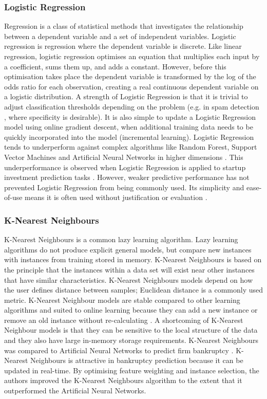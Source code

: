 \documentclass[../thesis/thesis.tex]{subfiles}
\begin{document}
\begin{refsection}
\subsubsection{Logistic Regression}

Regression is a class of statistical methods that investigates the relationship between a dependent variable and a set of independent variables. Logistic regression is regression where the dependent variable is discrete. Like linear regression, logistic regression optimises an equation that multiplies each input by a coefficient, sums them up, and adds a constant. However, before this optimisation takes place the dependent variable is transformed by the log of the odds ratio for each observation, creating a real continuous dependent variable on a logistic distribution. A strength of Logistic Regression is that it is trivial to adjust classification thresholds depending on the problem (e.g. in spam detection \cite{friedman2001}, where specificity is desirable). It is also simple to update a Logistic Regression model using online gradient descent, when additional training data needs to be quickly incorporated into the model (incremental learning). Logistic Regression tends to underperform against complex algorithms like Random Forest, Support Vector Machines and Artificial Neural Networks in higher dimensions \cite{caruana2008}. This underperformance is observed when Logistic Regression is applied to startup investment prediction tasks \cite{beckwith2016, bhat2011}. However, weaker predictive performance has not prevented Logistic Regression from being commonly used. Its simplicity and ease-of-use means it is often used without justification or evaluation \cite{gimmon2010}.

\subsubsection{K-Nearest Neighbours}

K-Nearest Neighbours is a common lazy learning algorithm. Lazy learning algorithms do not produce explicit general models, but compare new instances with instances from training stored in memory. K-Nearest Neighbours is based on the principle that the instances within a data set will exist near other instances that have similar characteristics. K-Nearest Neighbours models depend on how the user defines distance between samples; Euclidean distance is a commonly used metric. K-Nearest Neighbour models are stable compared to other learning algorithms and suited to online learning because they can add a new instance or remove an old instance without re-calculating \cite{kotsiantis2007}. A shortcoming of K-Nearest Neighbour models is that they can be sensitive to the local structure of the data and they also have large in-memory storage requirements. K-Nearest Neighbours was compared to Artificial Neural Networks to predict firm bankruptcy \cite{ahn2008}. K-Nearest Neighbours is attractive in bankruptcy prediction because it can be updated in real-time. By optimising feature weighting and instance selection, the authors improved the K-Nearest Neighbours algorithm to the extent that it outperformed the Artificial Neural Networks.


\end{refsection}
\end{document}
